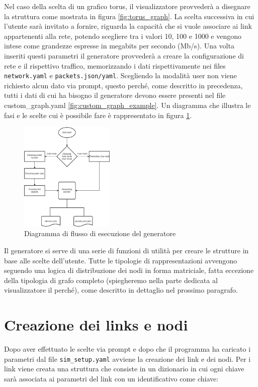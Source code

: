 \documentclass[binding=0.6cm]{sapthesis}
\begin{document}
Nel caso della scelta di un grafico torus, il visualizzatore provvederà a disegnare la struttura come mostrata in figura \ref{fig:torus_graph}.
La scelta successiva in cui l'utente sarà invitato a fornire, riguarda la capacità che si vuole associare ai link appartenenti alla rete, potendo
scegliere tra i valori 10, 100 e 1000 e vengono intese come grandezze espresse in megabits per secondo (Mb/s).
Una volta inseriti questi parametri il generatore provvederà a creare la configurazione di rete e il rispettivo traffico, memorizzando i dati rispettivamente
nei files \texttt{network.yaml} e \texttt{packets.json/yaml}.
Scegliendo la modalità user non viene richiesto alcun dato via prompt, questo perché, come descritto in precedenza, tutti i dati di cui ha bisogno
il generatore devono essere presenti nel file custom\_graph.yaml \ref{fig:custom_graph_example}. Un diagramma che illustra le fasi e le
 scelte cui è possibile fare
è rappresentato in figura \ref{fig:diagramma_generatore}.   
\begin{figure}[h]
    \centering
    \includegraphics[width=0.40\textwidth]{immagini/diagramma_selezioni_config_gen.jpg}
    \caption{Diagramma di flusso di esecuzione del generatore}
    \label{fig:diagramma_generatore}
\end{figure}


Il generatore si serve di una serie di funzioni di utilità per creare le strutture in base alle scelte dell'utente. 
Tutte le tipologie di rappresentazioni avvengono seguendo una logica di distribuzione dei nodi in forma matriciale, fatta eccezione della tipologia di
grafo completo (spiegheremo nella parte dedicata al visualizzatore il perché), come descritto in dettaglio nel prossimo paragrafo.


\section{Creazione dei links e nodi}
\label{sec:creazione_links_nodi}
Dopo aver effettuato le scelte via prompt e dopo che il programma ha caricato i parametri dal file \texttt{sim\_setup.yaml} 
avviene la creazione dei link e dei nodi. Per i link viene creata una struttura che consiste in un dizionario in cui ogni chiave sarà associata
ai parametri del link con un identificativo come chiave:
\end{document}
